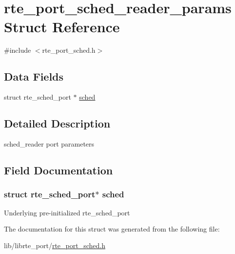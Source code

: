 \hypertarget{structrte__port__sched__reader__params}{}\section{rte\+\_\+port\+\_\+sched\+\_\+reader\+\_\+params Struct Reference}
\label{structrte__port__sched__reader__params}


{\ttfamily \#include $<$rte\+\_\+port\+\_\+sched.\+h$>$}

\subsection*{Data Fields}
\begin{DoxyCompactItemize}
\item 
struct rte\+\_\+sched\+\_\+port $\ast$ \hyperlink{structrte__port__sched__reader__params_afac65a177b53f7589c4bfd38423bde94}{sched}
\end{DoxyCompactItemize}


\subsection{Detailed Description}
sched\+\_\+reader port parameters 

\subsection{Field Documentation}
\hypertarget{structrte__port__sched__reader__params_afac65a177b53f7589c4bfd38423bde94}{}
\subsubsection[{sched}]{\setlength{\rightskip}{0pt plus 5cm}struct rte\+\_\+sched\+\_\+port$\ast$ sched}\label{structrte__port__sched__reader__params_afac65a177b53f7589c4bfd38423bde94}
Underlying pre-\/initialized rte\+\_\+sched\+\_\+port 

The documentation for this struct was generated from the following file\+:\begin{DoxyCompactItemize}
\item 
lib/librte\+\_\+port/\hyperlink{rte__port__sched_8h}{rte\+\_\+port\+\_\+sched.\+h}\end{DoxyCompactItemize}

